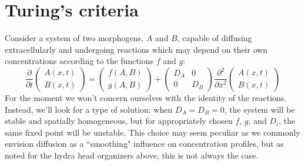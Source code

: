 \documentclass{article}
\begin{document}
\section*{Turing's criteria}

Consider a system of two morphogens, $A$ and $B$, capable of diffusing extracellularly and undergoing reactions which may depend on their own concentrations according to the functions $f$ and $g$:
\[ \frac{\partial }{\partial t} \begin{pmatrix} A(x,t) \\ B(x,t) \end{pmatrix} = \begin{pmatrix} f(A,B) \\ g(A,B) \end{pmatrix} + \begin{pmatrix} D_A & 0 \\ 0 & D_B \end{pmatrix} \frac{\partial^2}{\partial x^2} \begin{pmatrix} A(x,t) \\ B(x,t) \end{pmatrix} \]
For the moment we won't concern ourselves with the identity of the reactions. Instead, we'll look for a type of solution: when $D_A=D_B=0$, the system will be stable and spatially homogeneous, but for appropriately chosen $f$, $g$, and $D_i$, the same fixed point will be unstable. This choice may seem peculiar as we commonly envision diffusion as a ``smoothing" influence on concentration profiles, but as noted for the hydra head organizers above, this is not always the case.\\
\end{document}
